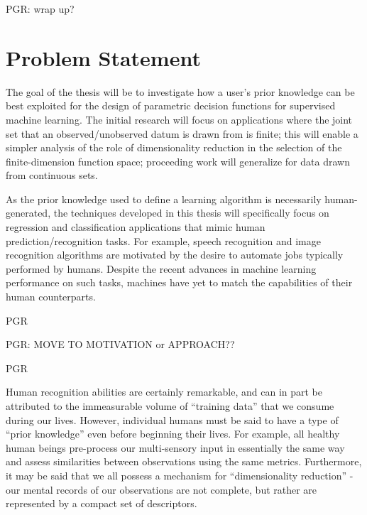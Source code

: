 \documentclass[12pt]{article}
\begin{document}
PGR: wrap up?











\newpage
\section{Problem Statement} \label{sec:prob}

The goal of the thesis will be to investigate how a user's prior knowledge can be best exploited for the design of parametric decision functions for supervised machine learning. The initial research will focus on applications where the joint set that an observed/unobserved datum is drawn from is finite; this will enable a simpler analysis of the role of dimensionality reduction in the selection of the finite-dimension function space; proceeding work will generalize for data drawn from continuous sets.

As the prior knowledge used to define a learning algorithm is necessarily human-generated, the techniques developed in this thesis will specifically focus on regression and classification applications that mimic human prediction/recognition tasks. For example, speech recognition and image recognition algorithms are motivated by the desire to automate jobs typically performed by humans. Despite the recent advances in machine learning performance on such tasks, machines have yet to match the capabilities of their human counterparts.

PGR

PGR: MOVE TO MOTIVATION or APPROACH??

PGR

Human recognition abilities are certainly remarkable, and can in part be attributed to the immeasurable volume of ``training data'' that we consume during our lives. However, individual humans must be said to have a type of ``prior knowledge'' even before beginning their lives. For example, all healthy human beings pre-process our multi-sensory input in essentially the same way and assess similarities between observations using the same metrics. Furthermore, it may be said that we all possess a mechanism for ``dimensionality reduction'' - our mental records of our observations are not complete, but rather are represented by a compact set of descriptors.
\end{document}
